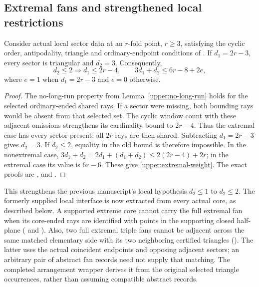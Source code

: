\subsection{Extremal fans and strengthened local restrictions}
\label{upper:extremal-fans}

\begin{theorem}
\label{upper:extremal-structure}
Consider actual local sector data at an $r$-fold point, $r\ge3$, satisfying
the cyclic order, antipodality, triangle and ordinary-endpoint conditions
of . If $d_1=2r-3$, every sector is triangular
and $d_2=3$. Consequently,
\begin{equation}
 d_2\le2\Longrightarrow d_1\le2r-4,
 \qquad 3d_1+d_2\le6r-8+2e,
 \label{upper:extremal-weight}
\end{equation}
where $e=1$ when $d_1=2r-3$ and $e=0$ otherwise.
\end{theorem}

\begin{proof}
The no-long-run property from Lemma~\ref{upper:no-long-run} holds for
the selected ordinary-ended shared rays. If a sector were missing,
both bounding rays would be absent from that selected set. The cyclic
window count with these adjacent omissions strengthens its cardinality
bound to $2r-4$. Thus the extremal case has every sector present; all
$2r$ rays are then shared. Subtracting $d_1=2r-3$ gives $d_2=3$.
If $d_2\le2$, equality in the old bound is therefore impossible.
In the nonextremal case,
$3d_1+d_2=2d_1+(d_1+d_2)\le2(2r-4)+2r$; in the extremal case its
value is $6r-6$. These give \eqref{upper:extremal-weight}.
The exact proofs are
,
and .
\end{proof}

This strengthens the previous manuscript's local hypothesis $d_2\le1$
to $d_2\le2$. The formerly supplied local interface is now extracted
from every actual core, as described below. A supported extreme core
cannot carry the full extremal fan
when its core-ended rays are identified with points in the supporting
closed half-plane ( and
). Also, two full extremal triple fans cannot
be adjacent across the same matched elementary side with its two
neighboring certified triangles (). The latter
uses the actual coincident endpoints and opposing adjacent sectors;
an arbitrary pair of abstract fan records need not supply that matching.
The completed arrangement wrapper derives it from the original selected
triangle occurrences, rather than assuming compatible abstract records.


